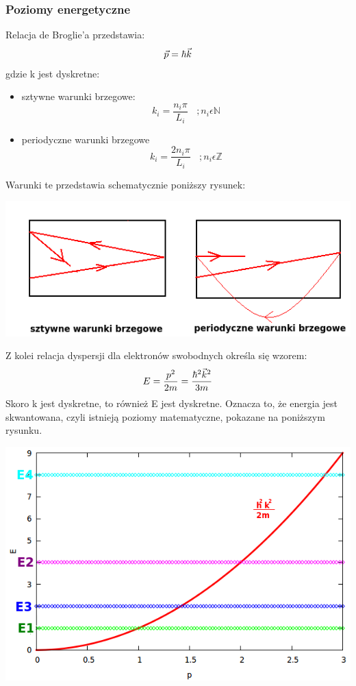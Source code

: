 \subsubsection{Poziomy energetyczne}
Relacja de Broglie'a przedstawia:
\begin{equation}\vec{p}=\hbar\vec{k}\end{equation}
gdzie k jest dyskretne:
\begin{itemize}
\item sztywne warunki brzegowe:
\begin{equation} k_i=\frac{n_i\pi}{L_i}~~~~;n_i\epsilon\mathbb{N}\end{equation}
\item periodyczne warunki brzegowe
\begin{equation} k_i=\frac{2n_i\pi}{L_i}~~~~;n_i\epsilon\mathbb{Z}\end{equation}
\end{itemize}
Warunki te przedstawia schematycznie poniższy rysunek:
\begin{center}\includegraphics[scale=0.75]{obrazki/wykl_7_obrazek2.png}\end{center}
Z kolei relacja dyspersji dla elektronów swobodnych określa się wzorem:
\begin{equation}E=\frac{p^2}{2m}=\frac{\hbar^2\vec{k}^2}{3m}\end{equation}
Skoro k jest dyskretne, to również E jest dyskretne. Oznacza to, że energia jest skwantowana, czyli istnieją poziomy matematyczne, pokazane na poniższym rysunku.
\begin{center}\includegraphics[scale=0.5]{obrazki/wykl_7_obrazek3.png}\end{center}
